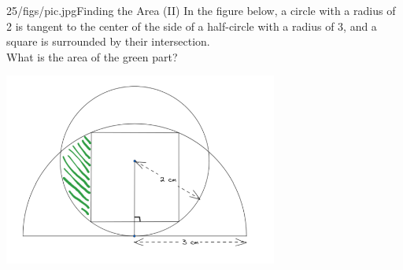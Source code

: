 \begin{problem}{25/figs/pic.jpg}{Finding the Area (II)}
In the figure below, a circle with a radius of 2 is tangent to the center of the side of a half-circle with a radius of 3, and a square is surrounded by their intersection.\\[0.2cm]

What is the area of the green part?

\begin{center}
	\includegraphics[width=9cm]{25/figs/25_area.png}
\end{center}

\end{problem}